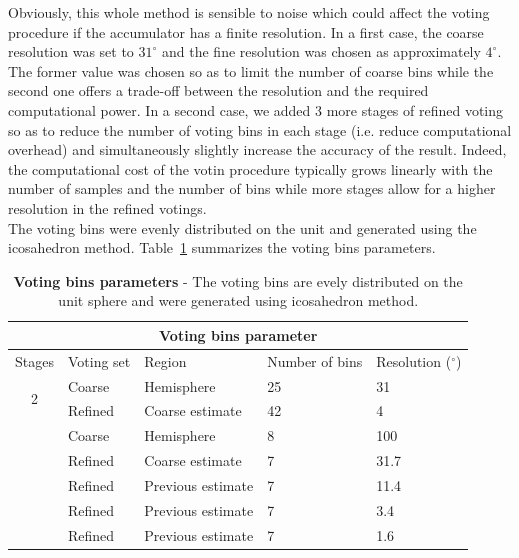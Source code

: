 Obviously, this whole method is sensible to noise which could affect the voting procedure if the accumulator has a finite resolution. In a first case, the coarse resolution was set to $31^\circ$ and the fine resolution was chosen as approximately $4^\circ$. The former value was chosen so as to limit the number of coarse bins while the second one offers a trade-off between the resolution and the required computational power. In a second case, we added 3 more stages of refined voting so as to reduce the number of voting bins in each stage (i.e. reduce computational overhead) and simultaneously slightly increase the accuracy of the result. Indeed, the computational cost of the votin procedure typically grows linearly with the number of samples and the number of bins while more stages allow for a higher resolution in the refined votings.\\
The voting bins were evenly distributed on the unit and generated using the icosahedron method. Table~\ref{tab:votingBins} summarizes the voting bins parameters.

\begin{table}[h!]
	\centering
	\begin{tabular}{|c|p{2cm}||p{3cm}|p{3cm}|p{3cm}|}
	   \hline
	   \multicolumn{5}{|c|}{Voting bins parameter} \\
	   \hline
	   Stages & Voting set & Region & Number of bins & Resolution ($^\circ$) \\
	   \hline
	   \multirow{2}{*}{2} & Coarse & Hemisphere & 25 & 31\\
	   \cline{2-5}
	    & Refined & Coarse estimate & 42 & 4\\
	   \hhline{|=|=#=|=|=|}
	   \multirow{5}{*}{5} & Coarse & Hemisphere & 8 & 100\\
	   \cline{2-5}
	    & Refined & Coarse estimate & 7 & 31.7\\
	   \cline{2-5}
	    & Refined & Previous estimate & 7 & 11.4\\
	   \cline{2-5}
	    & Refined & Previous estimate & 7 & 3.4\\
	   \cline{2-5}
	    & Refined & Previous estimate & 7 & 1.6\\
	   \hline
	\end{tabular}
	\caption{\textbf{Voting bins parameters} - The voting bins are evely distributed on the unit sphere and were generated using icosahedron method.}
	\label{tab:votingBins}
\end{table}


